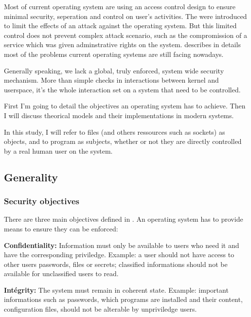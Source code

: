 \documentclass[pdftex,a4paper,titlepage,11pt]{article}
\begin{document}
\smallskip

Most of current operating system are using an access control design to ensure
minimal security, seperation and control on user's activities. The were
introduced to limit the effects of an attack against the operating system. But
this limited control does not prevent complex attack scenario, such as the
compromission of a service which was given adminstrative rights on the system.
\cite{NSATIOF} describes in details most of the problems current operating
systems are still facing nowadays.

\bigskip

Generally speaking, we lack a global, truly enforced, system wide security
mechanism. More than simple checks in interactions between kernel and userspace,
it's the whole interaction set on a system that need to be controlled.

\bigskip

First I'm going to detail the objectives an operating system has to achieve.
Then I will discuss theorical models and their implementations in modern
systems.

\bigskip

In this study, I will refer to files (and others ressources such as sockets) as
objects, and to program as subjects, whether or not they are directly controlled
by a real human user on the system.

\subsection{Generality}

\subsubsection{Security objectives}

There are three main objectives defined in \cite{SECOBJ}. An operating  system
has to provide means to ensure they can be enforced:

\bigskip

\textbf{Confidentiality:}
Information must only be available to users who need it and have the
corresponding priviledge. Example: a user should not have access to other users
passwords, files or secrets; classified informations should not be available for
unclassified users to read.

\medskip

\textbf{Intégrity:}
The system must remain in coherent state. Example: important informations such
as passwords, which programs are installed and their content, configuration
files, should not be alterable by unpriviledge users.
\end{document}
